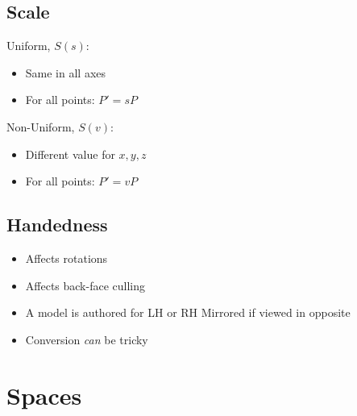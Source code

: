 \subsection{Scale}
Uniform, $S(s)$:
\begin{itemize}
	\item Same in all axes
	\item For all points: $P' = sP$	
\end{itemize}
Non-Uniform, $S(v)$:
\begin{itemize}
	\item Different value for $x,y,z$
	\item For all points: $P' = vP$	
\end{itemize}

\subsection{Handedness}
\begin{itemize}
	\item Affects rotations
	\item Affects back-face culling
	\item A model is authored for LH or RH
	\subitem Mirrored if viewed in opposite
	\item Conversion \textit{can} be tricky	
\end{itemize}


\section{Spaces}
